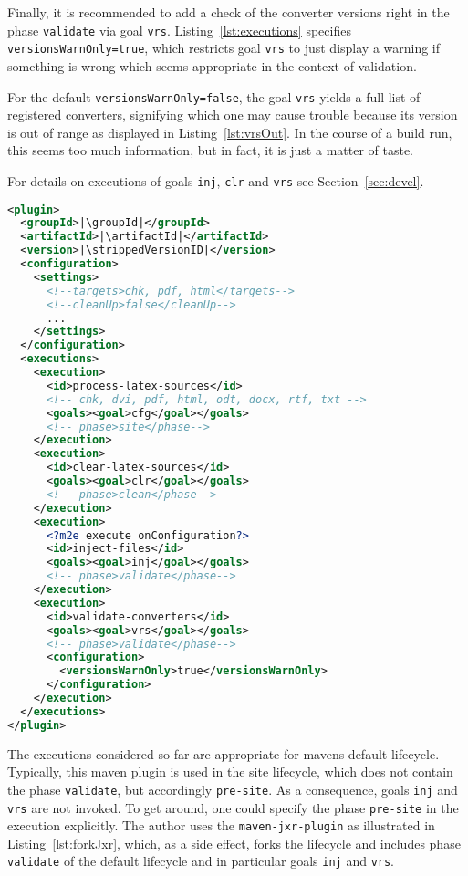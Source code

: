 Finally, it is recommended to add a check of the converter versions
right in the phase \texttt{validate} via goal \texttt{vrs}.
Listing~\ref{lst:executions} specifies \texttt{versionsWarnOnly=true}, 
which restricts goal \texttt{vrs} to just display a warning 
if something is wrong 
which seems appropriate in the context of validation. 

For the default \texttt{versionsWarnOnly=false}, 
the goal \texttt{vrs} 
yields a full list of registered converters, 
signifying which one may cause trouble 
because its version is out of range
as displayed in Listing~\ref{lst:vrsOut}. 
In the course of a build run, this seems too much information, 
but in fact, it is just a matter of taste. 

For details on executions of goals \texttt{inj}, \texttt{clr} and \texttt{vrs} 
see Section~\ref{sec:devel}. 


\begin{lstlisting}[language=XML, basicstyle=\footnotesize,
escapechar=|,
float, captionpos=hb, label={lst:executions}, 
caption={The executions of this plugin}]
<plugin>
  <groupId>|\groupId|</groupId>
  <artifactId>|\artifactId|</artifactId>
  <version>|\strippedVersionID|</version>
  <configuration>
    <settings>
      <!--targets>chk, pdf, html</targets-->
      <!--cleanUp>false</cleanUp-->
      ...
    </settings>
  </configuration>
  <executions>
    <execution>
      <id>process-latex-sources</id>
      <!-- chk, dvi, pdf, html, odt, docx, rtf, txt -->
      <goals><goal>cfg</goal></goals>
      <!-- phase>site</phase-->
    </execution>
    <execution>
      <id>clear-latex-sources</id>
      <goals><goal>clr</goal></goals>
      <!-- phase>clean</phase-->
    </execution>
    <execution>
      <?m2e execute onConfiguration?>
      <id>inject-files</id>
      <goals><goal>inj</goal></goals>
      <!-- phase>validate</phase-->
    </execution>
    <execution>
      <id>validate-converters</id>
      <goals><goal>vrs</goal></goals>
      <!-- phase>validate</phase-->
      <configuration>
        <versionsWarnOnly>true</versionsWarnOnly>
      </configuration>
    </execution>
  </executions>
</plugin>
\end{lstlisting}

The executions considered so far are appropriate 
for mavens default lifecycle. 
Typically, this maven plugin is used in the site lifecycle, 
which does not contain the phase \texttt{validate}, 
but accordingly \texttt{pre-site}. 
As a consequence, goals \texttt{inj} and \texttt{vrs} are not invoked. 
To get around, 
one could specify the phase \texttt{pre-site} in the execution explicitly. 
The author uses the \texttt{maven-jxr-plugin} 
as illustrated in Listing~\ref{lst:forkJxr}, 
which, as a side effect, forks the lifecycle 
and includes phase \texttt{validate} of the default lifecycle 
and in particular goals \texttt{inj} and \texttt{vrs}. 



